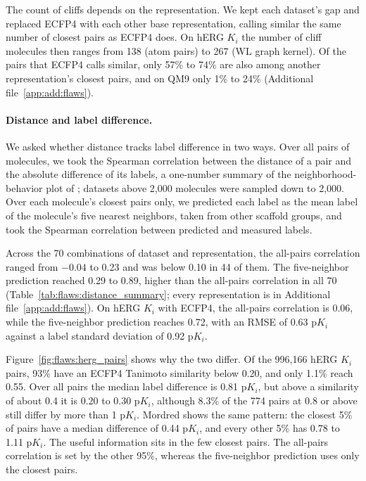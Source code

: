 The count of cliffs depends on the representation. We kept each dataset's gap and replaced ECFP4 with each other base representation, calling similar the same number of closest pairs as ECFP4 does. On hERG $K_i$ the number of cliff molecules then ranges from 138 (atom pairs) to 267 (WL graph kernel). Of the pairs that ECFP4 calls similar, only 57\% to 74\% are also among another representation's closest pairs, and on QM9 only 1\% to 24\% (Additional file~\ref{app:add:flaws}).

\paragraph{Distance and label difference.} We asked whether distance tracks label difference in two ways. Over all pairs of molecules, we took the Spearman correlation between the distance of a pair and the absolute difference of its labels, a one-number summary of the neighborhood-behavior plot of \citet{Patterson1996}; datasets above 2,000 molecules were sampled down to 2,000. Over each molecule's closest pairs only, we predicted each label as the mean label of the molecule's five nearest neighbors, taken from other scaffold groups, and took the Spearman correlation between predicted and measured labels.

Across the 70 combinations of dataset and representation, the all-pairs correlation ranged from $-0.04$ to 0.23 and was below 0.10 in 44 of them. The five-neighbor prediction reached 0.29 to 0.89, higher than the all-pairs correlation in all 70 (Table~\ref{tab:flaws:distance_summary}; every representation is in Additional file~\ref{app:add:flaws}). On hERG $K_i$ with ECFP4, the all-pairs correlation is 0.06, while the five-neighbor prediction reaches 0.72, with an RMSE of 0.63 p$K_i$ against a label standard deviation of 0.92 p$K_i$.

Figure~\ref{fig:flaws:herg_pairs} shows why the two differ. Of the 996,166 hERG $K_i$ pairs, 93\% have an ECFP4 Tanimoto similarity below 0.20, and only 1.1\% reach 0.55. Over all pairs the median label difference is 0.81 p$K_i$, but above a similarity of about 0.4 it is 0.20 to 0.30 p$K_i$, although 8.3\% of the 774 pairs at 0.8 or above still differ by more than 1 p$K_i$. Mordred shows the same pattern: the closest 5\% of pairs have a median difference of 0.44 p$K_i$, and every other 5\% has 0.78 to 1.11 p$K_i$. The useful information sits in the few closest pairs. The all-pairs correlation is set by the other 95\%, whereas the five-neighbor prediction uses only the closest pairs.

